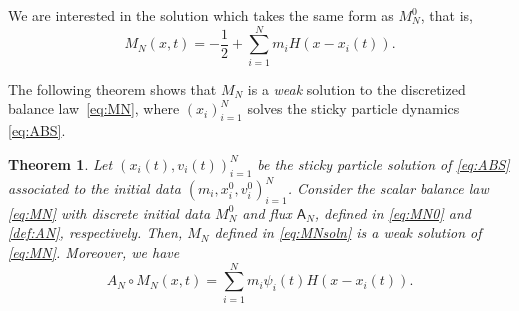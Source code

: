 \documentclass[11pt,reqno]{amsart}
\newtheorem{theorem}{Theorem}[section]
\theoremstyle{definition}
\theoremstyle{remark}
\def\A{\mathsf{A}}
\begin{document}
	We are interested in the solution which takes the same form as $M_N^0$, that is,
	\begin{equation}
		\label{eq:MNsoln}
		M_N(x,t) = -\frac12+\sum_{i=1}^{N} m_i H(x-x_i(t)).
	\end{equation}
	
	The following theorem shows that $M_N$ is a \emph{weak} solution to the discretized balance law~\eqref{eq:MN}, where $(x_i)_{i=1}^N$ solves the sticky particle dynamics \eqref{eq:ABS}.
	\begin{theorem} \label{thm:discrete}
		Let $(x_i(t),v_i(t))_{i=1}^{N}$ be the sticky particle solution of \eqref{eq:ABS} associated to the initial data $(m_i, x_i^0,v_i^0)_{i=1}^{N}$. 
		Consider the scalar balance law \eqref{eq:MN} with discrete initial data $M_N^0$ and flux $\A_N$, defined in \eqref{eq:MN0} and \eqref{def:AN}, respectively.
		Then, $M_N$ defined in \eqref{eq:MNsoln} is a weak solution of \eqref{eq:MN}. Moreover, we have
		\begin{equation}\label{e:QN}
			A_N\circ M_N (x,t) = \sum_{i=1}^{N} m_i \psi_i(t)H(x-x_i(t)).
		\end{equation}
	\end{theorem}
	
\end{document}
